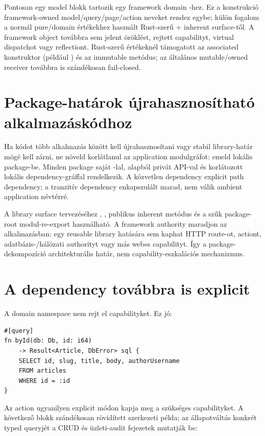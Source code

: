 Pontosan egy model blokk tartozik egy framework domain -hez. Ez a konstrukció framework-owned model/query/page/action neveket rendez egybe; külön fogalom a normál pure/domain értékekhez használt Rust-szerű  + inherent  surface-től. A framework object továbbra sem jelent öröklést, rejtett capabilityt, virtual dispatchot vagy reflectiont. Rust-szerű értékeknél támogatott az associated konstruktor (például ) és az immutable  metódus; az általános mutable/owned receiver továbbra is szándékosan fail-closed.


\section{Package-határok újrahasznosítható alkalmazáskódhoz}

Ha kódot több alkalmazás között kell újrahasznosítani vagy stabil library-határ mögé kell zárni, ne növeld korlátlanul az application modulgráfot: emeld lokális package-be. Minden package saját -lal, alapból privát API-val és korlátozott lokális dependency-gráffal rendelkezik. A közvetlen dependency explicit path dependency; a tranzitív dependency enkapszulált marad, nem válik ambient application névtérré.

A library surface tervezéséhez , , publikus inherent metódus és a szűk package-root modul-re-export használható. A framework authority maradjon az alkalmazásban: egy reusable library  hatására sem kaphat HTTP route-ot, actiont, adatbázis-/hálózati authorityt vagy más webes capabilityt. Így a package-dekompozíció architekturális határ, nem capability-eszkalációs mechanizmus.

\section{A dependency továbbra is explicit}

A domain namespace nem rejt el capabilityket. Ez jó:

\begin{lstlisting}[language=Velran]
#[query]
fn byId(db: Db, id: i64)
    -> Result<Article, DbError> sql {
    SELECT id, slug, title, body, authorUsername
    FROM articles
    WHERE id = :id
}
\end{lstlisting}

Az action ugyanilyen explicit módon kapja meg a szükséges capabilityket. A következő blokk szándékosan rövidített szerkezeti példa; az állapotváltás konkrét typed queryjét a CRUD és üzleti-audit fejezetek mutatják be:


